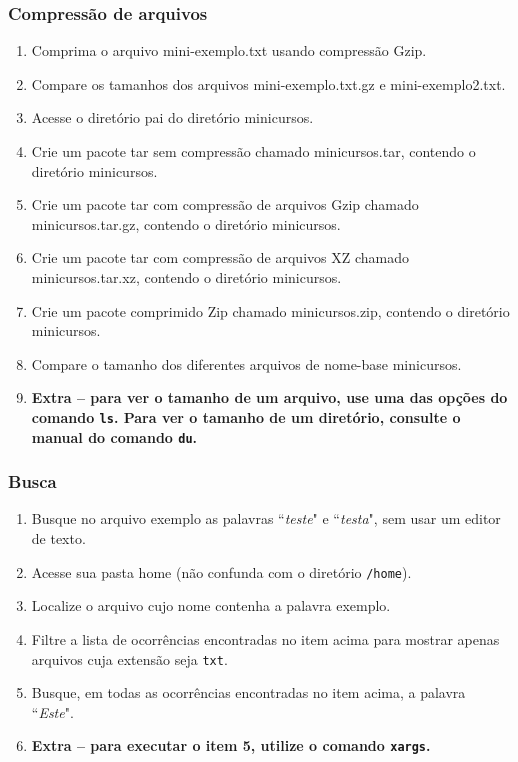 \documentclass[a4paper,10pt,titlepage,twosided]{book}
\begin{document}
\subsubsection{Compressão de arquivos}

\begin{enumerate}
\medskip
\item Comprima o arquivo \textsf{mini-exemplo.txt} usando compressão Gzip.
\item Compare os tamanhos dos arquivos \textsf{mini-exemplo.txt.gz} e \textsf{mini-exemplo2.txt}.
\item Acesse o diretório pai do diretório \textsf{minicursos}.
\item Crie um pacote \textsf{tar} sem compressão chamado \textsf{minicursos.tar}, contendo o diretório \textsf{minicursos}.
\item Crie um pacote \textsf{tar} com compressão de arquivos Gzip chamado \textsf{minicursos.tar.gz}, contendo o diretório \textsf{minicursos}.
\item Crie um pacote \textsf{tar} com compressão de arquivos XZ chamado \textsf{minicursos.tar.xz}, contendo o diretório \textsf{minicursos}.
\item Crie um pacote comprimido Zip chamado \textsf{minicursos.zip}, contendo o diretório \textsf{minicursos}.
\item Compare o tamanho dos diferentes arquivos de nome-base \textsf{minicursos}.
\item[] \textbf{Extra -- para ver o tamanho de um arquivo, use uma das opções do comando \texttt{ls}. Para ver o tamanho de um diretório, consulte o manual do comando \texttt{du}.}
\end{enumerate}

\subsubsection{Busca}

\begin{enumerate}
\medskip
\item Busque no arquivo exemplo as palavras ``\emph{teste}" e ``\emph{testa}", sem usar um editor de texto.
\item Acesse sua pasta home (não confunda com o diretório \texttt{/home}).
\item Localize o arquivo cujo nome contenha a palavra \textsf{exemplo}.
\item Filtre a lista de ocorrências encontradas no item acima para mostrar apenas arquivos cuja extensão seja \texttt{txt}.
\item Busque, em todas as ocorrências encontradas no item acima, a palavra ``\emph{Este}".
\item[] \textbf{Extra -- para executar o item 5, utilize o comando \texttt{xargs}.}
\end{enumerate}
\end{document}
